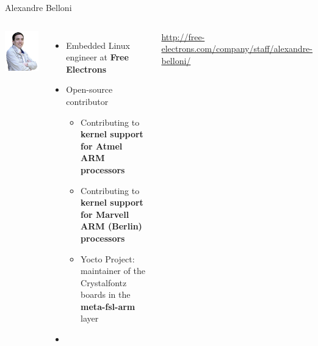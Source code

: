 \begin{frame}{Alexandre Belloni}
 \begin{columns}
    \includegraphics[width=\textwidth]{slides/first-slides/alexandre-belloni.png}
    \begin{itemize}
      \item Embedded Linux engineer at {\bf Free Electrons}
      \item Open-source contributor
        \begin{itemize}
          \item Contributing to {\bf kernel support for Atmel ARM
            processors}
          \item Contributing to {\bf kernel support for Marvell
            ARM (Berlin) processors}
          \item Yocto Project: maintainer of the Crystalfontz boards
            in the {\bf meta-fsl-arm} layer
        \end{itemize}
      \item {}
    \end{itemize}
    \url{http://free-electrons.com/company/staff/alexandre-belloni/}
 \end{columns}
\end{frame}


